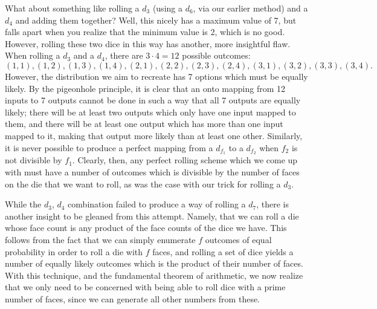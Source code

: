 \documentclass{article}
\begin{document}
\par What about something like rolling a $d_3$ (using a $d_6$, via our earlier method) and a $d_4$ and adding them together?
Well, this nicely has a maximum value of 7, but falls apart when you realize that the minimum value is 2, which is no good.
However, rolling these two dice in this way has another, more insightful flaw.
When rolling a $d_3$ and a $d_4$, there are $3 \cdot 4 = 12$ possible outcomes: $$(1, 1), (1, 2), (1, 3), (1, 4), (2, 1), (2, 2), (2, 3), (2, 4), (3, 1), (3, 2), (3, 3), (3, 4).$$
However, the distribution we aim to recreate has 7 options which must be equally likely.
By the pigeonhole principle, it is clear that an onto mapping from 12 inputs to 7 outputs cannot be done in such a way that all 7 outputs are equally likely; there will be at least two outputs which only have one input mapped to them, and there will be at least one output which has more than one input mapped to it, making that output more likely than at least one other.
Similarly, it is never possible to produce a perfect mapping from a $d_{f_1}$ to a $d_{f_2}$ when $f_2$ is not divisible by $f_1$.
Clearly, then, any perfect rolling scheme which we come up with must have a number of outcomes which is divisible by the number of faces on the die that we want to roll, as was the case with our trick for rolling a $d_3$.

\par While the $d_3$, $d_4$ combination failed to produce a way of rolling a $d_7$, there is another insight to be gleaned from this attempt.
Namely, that we can roll a die whose face count is any product of the face counts of the dice we have. 
This follows from the fact that we can simply enumerate $f$ outcomes of equal probability in order to roll a die with $f$ faces, and rolling a set of dice yields a number of equally likely outcomes which is the product of their number of faces.
With this technique, and the fundamental theorem of arithmetic, we now realize that we only need to be concerned with being able to roll dice with a prime number of faces, since we can generate all other numbers from these.
\end{document}
